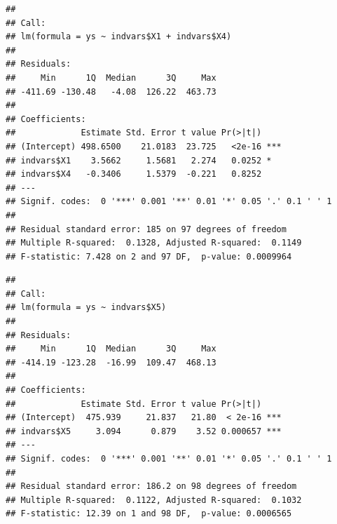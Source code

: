 \documentclass[
]{book}
\newenvironment{Shaded}{\begin{snugshade}}{\end{snugshade}}
\newcommand{\FunctionTok}[1]{\textcolor[rgb]{0.13,0.29,0.53}{\textbf{#1}}}
\newcommand{\NormalTok}[1]{#1}
\newcommand{\OtherTok}[1]{\textcolor[rgb]{0.56,0.35,0.01}{#1}}
\newcommand{\SpecialCharTok}[1]{\textcolor[rgb]{0.81,0.36,0.00}{\textbf{#1}}}
\begin{document}
\begin{Shaded}
\end{Shaded}

\begin{verbatim}
## 
## Call:
## lm(formula = ys ~ indvars$X1 + indvars$X4)
## 
## Residuals:
##     Min      1Q  Median      3Q     Max 
## -411.69 -130.48   -4.08  126.22  463.73 
## 
## Coefficients:
##             Estimate Std. Error t value Pr(>|t|)    
## (Intercept) 498.6500    21.0183  23.725   <2e-16 ***
## indvars$X1    3.5662     1.5681   2.274   0.0252 *  
## indvars$X4   -0.3406     1.5379  -0.221   0.8252    
## ---
## Signif. codes:  0 '***' 0.001 '**' 0.01 '*' 0.05 '.' 0.1 ' ' 1
## 
## Residual standard error: 185 on 97 degrees of freedom
## Multiple R-squared:  0.1328, Adjusted R-squared:  0.1149 
## F-statistic: 7.428 on 2 and 97 DF,  p-value: 0.0009964
\end{verbatim}

\begin{Shaded}
\end{Shaded}

\begin{verbatim}
## 
## Call:
## lm(formula = ys ~ indvars$X5)
## 
## Residuals:
##     Min      1Q  Median      3Q     Max 
## -414.19 -123.28  -16.99  109.47  468.13 
## 
## Coefficients:
##             Estimate Std. Error t value Pr(>|t|)    
## (Intercept)  475.939     21.837   21.80  < 2e-16 ***
## indvars$X5     3.094      0.879    3.52 0.000657 ***
## ---
## Signif. codes:  0 '***' 0.001 '**' 0.01 '*' 0.05 '.' 0.1 ' ' 1
## 
## Residual standard error: 186.2 on 98 degrees of freedom
## Multiple R-squared:  0.1122, Adjusted R-squared:  0.1032 
## F-statistic: 12.39 on 1 and 98 DF,  p-value: 0.0006565
\end{verbatim}

\begin{Shaded}
\end{Shaded}
\end{document}
